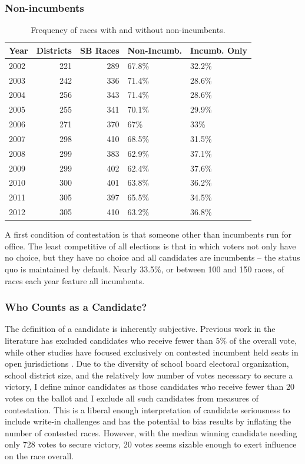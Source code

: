 \subsubsection{Non-incumbents}

\begin{table}[ht]
\centering
\begin{tabular}{lrrll}
  \hline
Year & Districts & SB Races & Non-Incumb. & Incumb. Only \\ 
  \hline
2002 & 221 & 289 & 67.8\% & 32.2\% \\ 
  2003 & 242 & 336 & 71.4\% & 28.6\% \\ 
  2004 & 256 & 343 & 71.4\% & 28.6\% \\ 
  2005 & 255 & 341 & 70.1\% & 29.9\% \\ 
  2006 & 271 & 370 & 67\% & 33\% \\ 
  2007 & 298 & 410 & 68.5\% & 31.5\% \\ 
  2008 & 299 & 383 & 62.9\% & 37.1\% \\ 
  2009 & 299 & 402 & 62.4\% & 37.6\% \\ 
  2010 & 300 & 401 & 63.8\% & 36.2\% \\ 
  2011 & 305 & 397 & 65.5\% & 34.5\% \\ 
  2012 & 305 & 410 & 63.2\% & 36.8\% \\ 
   \hline
\end{tabular}
\caption{Frequency of races with and without non-incumbents.} 
\label{tab:nifreq}
\end{table}


A first condition of contestation is that someone other than incumbents run for 
office. The least competitive of all elections is that in which voters not only 
have no choice, but they have no choice and all candidates are incumbents -- the 
status quo is maintained by default. Nearly 
33.5\%, or between 
100 and 150 races, of races each year feature all incumbents. 

\subsubsection{Who Counts as a Candidate?}

The definition of a candidate is inherently subjective. Previous work in the 
literature has excluded candidates who receive fewer than 5\% of the overall vote, 
while other studies have focused exclusively on contested incumbent held seats in 
open jurisdictions \citep{krebs,oliver}. Due to the diversity of school board 
electoral organization, school district size, and the relatively low number of votes 
necessary to secure a victory, I define minor candidates as those candidates who 
receive fewer than 20 votes on the ballot and I exclude all such candidates from 
measures of contestation. This is a liberal enough interpretation 
of candidate seriousness to include write-in challenges and has the potential to 
bias results by inflating the number of contested races. However, with the 
median winning candidate needing only 728 
votes to secure victory, 20 votes seems sizable enough to exert influence on the race overall. 


